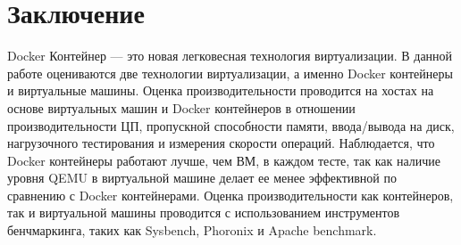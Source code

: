 \documentclass{mirea}
\begin{document}
	\section{Заключение}
	
	Docker Контейнер — это новая легковесная технология виртуализации. В данной работе оцениваются две технологии виртуализации, а именно Docker контейнеры и виртуальные машины. Оценка производительности проводится на хостах на основе виртуальных машин и Docker контейнеров в отношении производительности ЦП, пропускной способности памяти, ввода/вывода на диск, нагрузочного тестирования и измерения скорости операций. Наблюдается, что Docker контейнеры работают лучше, чем ВМ, в каждом тесте, так как наличие уровня QEMU в виртуальной машине делает ее менее эффективной по сравнению с Docker контейнерами. Оценка производительности как контейнеров, так и виртуальной машины проводится с использованием инструментов бенчмаркинга, таких как Sysbench, Phoronix и Apache benchmark.

	
	
\end{document}
